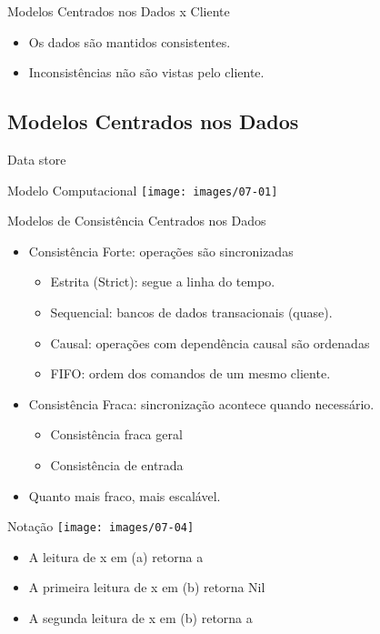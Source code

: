 \begin{frame}{Modelos Centrados nos Dados x Cliente}
\begin{itemize}
	\item Os dados são mantidos consistentes.
	\item Inconsistências não são vistas pelo cliente.
\end{itemize}
\end{frame}


\subsection{Modelos Centrados nos Dados}

\begin{frame}{Data store}
\begin{block}{Modelo Computacional}
	\center
	\texttt{[image: images/07-01]}
\end{block}
\end{frame}

\begin{frame}{Modelos de Consistência Centrados nos Dados}
\begin{itemize}
	\item Consistência Forte: operações são sincronizadas
	\begin{itemize}
		\item Estrita (Strict): segue a linha do tempo.
		\item Sequencial: bancos de dados transacionais (quase).
		\item Causal: operações com dependência causal são ordenadas
		\item FIFO: ordem dos comandos de um mesmo cliente.
	\end{itemize}
	\item Consistência Fraca: sincronização acontece quando necessário.
	\begin{itemize}
		\item Consistência fraca geral
		\item Consistência de entrada
	\end{itemize}
	\item Quanto mais fraco, mais escalável.
\end{itemize}
\end{frame}

\begin{frame}{Notação}
\texttt{[image: images/07-04]}

\begin{itemize}
	\item A leitura de x em (a) retorna a
	\item A primeira leitura de x em (b) retorna Nil
	\item A segunda  leitura de x em (b) retorna a
\end{itemize}
\end{frame}

